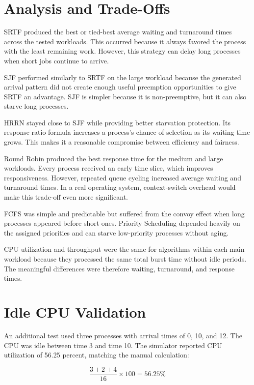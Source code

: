 \documentclass[12pt]{article}
\begin{document}
\section{Analysis and Trade-Offs}

SRTF produced the best or tied-best average waiting and turnaround times across
the tested workloads. This occurred because it always favored the process with
the least remaining work. However, this strategy can delay long processes when
short jobs continue to arrive.

SJF performed similarly to SRTF on the large workload because the generated
arrival pattern did not create enough useful preemption opportunities to give
SRTF an advantage. SJF is simpler because it is non-preemptive, but it can also
starve long processes.

HRRN stayed close to SJF while providing better starvation protection. Its
response-ratio formula increases a process's chance of selection as its waiting
time grows. This makes it a reasonable compromise between efficiency and
fairness.

Round Robin produced the best response time for the medium and large workloads.
Every process received an early time slice, which improves responsiveness.
However, repeated queue cycling increased average waiting and turnaround times.
In a real operating system, context-switch overhead would make this trade-off
even more significant.

FCFS was simple and predictable but suffered from the convoy effect when long
processes appeared before short ones. Priority Scheduling depended heavily on
the assigned priorities and can starve low-priority processes without aging.

CPU utilization and throughput were the same for algorithms within each main
workload because they processed the same total burst time without idle periods.
The meaningful differences were therefore waiting, turnaround, and response
times.

\section{Idle CPU Validation}

An additional test used three processes with arrival times of 0, 10, and 12.
The CPU was idle between time 3 and time 10. The simulator reported CPU
utilization of 56.25 percent, matching the manual calculation:

\begin{equation}
\frac{3 + 2 + 4}{16} \times 100 = 56.25\%
\end{equation}
\end{document}
